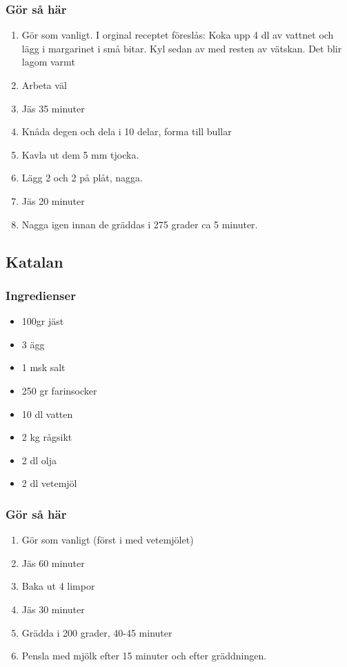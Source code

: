 \documentclass[a4paper,11pt,twocolumn]{article}
\begin{document}
\subsubsection*{Gör så här}
\begin{enumerate}[label=\arabic*.]
    \item Gör som vanligt. I orginal receptet föreslås: Koka upp 4 dl av vattnet och lägg i margarinet i små bitar. Kyl sedan av med resten av vätskan. Det blir lagom varmt
    \item Arbeta väl
    \item Jäs 35 minuter
    \item Knåda degen och dela i 10 delar, forma till bullar
    \item Kavla ut dem 5 mm tjocka.
    \item Lägg 2 och 2 på plåt, nagga.
    \item Jäs 20 minuter
    \item Nagga igen innan de gräddas i 275 grader ca 5 minuter.
\end{enumerate}




\subsection{Katalan}
\subsubsection*{Ingredienser}
\begin{itemize}[noitemsep]
    \item 100gr jäst
    \item 3 ägg
    \item 1 msk salt
    \item 250 gr farinsocker
    \item 10 dl vatten
    \item 2 kg rågsikt
    \item 2 dl olja
    \item 2 dl vetemjöl
\end{itemize}
\subsubsection*{Gör så här}
\begin{enumerate}[label=\arabic*.]
    \item Gör som vanligt (först i med vetemjölet)
    \item Jäs 60 minuter
    \item Baka ut 4 limpor
    \item Jäs 30 minuter
    \item Grädda i 200 grader, 40-45 minuter
    \item Pensla med mjölk efter 15 minuter och efter gräddningen.
\end{enumerate}
\end{document}
